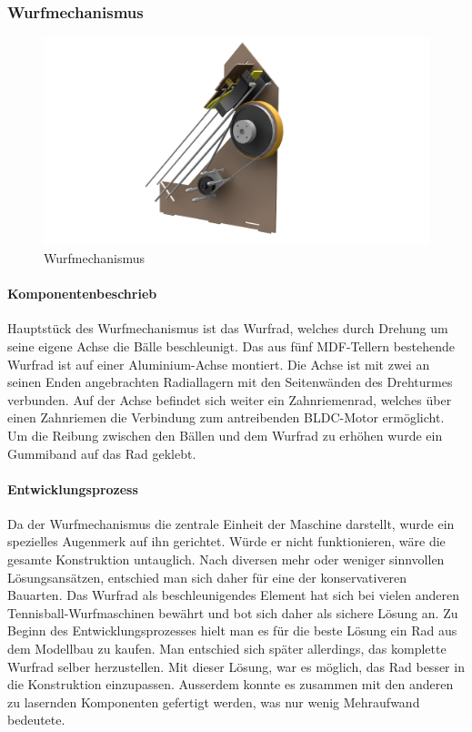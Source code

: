 \subsubsection{Wurfmechanismus}
\begin{figure}[h!]
	\centering
	\includegraphics[width=\linewidth]{../../fig/Wurfmechanismus}
	\caption{Wurfmechanismus}
	\label{fig:Wurfmechanismus}
\end{figure}
\paragraph{Komponentenbeschrieb}

Hauptstück des Wurfmechanismus ist das Wurfrad, welches durch Drehung um seine eigene Achse die Bälle beschleunigt.
Das aus fünf MDF-Tellern bestehende Wurfrad ist auf einer  Aluminium-Achse montiert. Die Achse ist mit zwei an seinen Enden angebrachten Radiallagern mit den Seitenwänden des Drehturmes verbunden. Auf der Achse befindet sich weiter ein Zahnriemenrad, welches über einen Zahnriemen die Verbindung zum antreibenden BLDC-Motor ermöglicht.
Um die Reibung zwischen den Bällen und dem Wurfrad zu erhöhen wurde ein Gummiband auf das Rad geklebt.

\paragraph{Entwicklungsprozess}

Da der Wurfmechanismus die zentrale Einheit der Maschine darstellt, wurde ein spezielles Augenmerk auf ihn gerichtet. Würde er nicht funktionieren, wäre die gesamte Konstruktion untauglich. Nach diversen mehr oder weniger sinnvollen Lösungsansätzen, entschied man sich daher für eine der konservativeren Bauarten.
Das Wurfrad als beschleunigendes Element hat sich bei vielen anderen Tennisball-Wurfmaschinen bewährt und bot sich daher als sichere Lösung an.
Zu Beginn des Entwicklungsprozesses hielt man es für die beste Lösung ein Rad aus dem Modellbau zu kaufen. Man entschied sich später allerdings, das komplette Wurfrad selber herzustellen. Mit dieser Lösung, war es möglich, das Rad besser in die Konstruktion einzupassen. Ausserdem konnte es zusammen mit den anderen zu lasernden Komponenten gefertigt werden, was nur wenig Mehraufwand bedeutete.